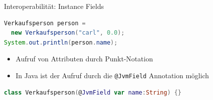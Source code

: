\documentclass{beamer}
\begin{document}
\begin{frame}[fragile]{Interoperabilität: Instance Fields}
  \begin{lstlisting}[language=Java]
Verkaufsperson person =
  new Verkaufsperson("carl", 0.0);
System.out.println(person.name);
  \end{lstlisting}
  \pause
  \begin{itemize}[<+->]
    \item Aufruf von Attributen durch Punkt-Notation
    \item In Java ist der Aufruf durch die \texttt{@JvmField} Annotation möglich
  \end{itemize}
  \pause
  \begin{lstlisting}[language=Kotlin]
class Verkaufsperson(@JvmField var name:String) {}
  \end{lstlisting}
\end{frame}
\end{document}
